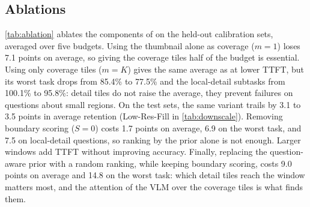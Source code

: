 \subsection{Ablations}
\label{sec:ablation}



\cref{tab:ablation} ablates the components of \method on the held-out calibration sets, averaged over
five budgets. Using the thumbnail alone as coverage ($m=1$) loses 7.1 points on average, so giving
the coverage tiles half of the budget is essential. Using only coverage tiles ($m=K$) gives the same average
as \method at lower TTFT, but its worst task drops from 85.4\% to 77.5\% and the local-detail subtasks
from 100.1\% to 95.8\%: detail tiles do not raise the average, they prevent failures on questions about
small regions. On the test sets, the same variant trails \method by 3.1 to 3.5 points in average retention
(Low-Res-Fill in \cref{tab:downscale}). Removing boundary scoring ($S=0$) costs 1.7 points on average, 6.9 on the worst task, and
7.5 on local-detail questions, so ranking by the prior alone is not enough. Larger windows add TTFT
without improving accuracy. Finally, replacing the question-aware prior with a random ranking, while
keeping boundary scoring, costs 9.0 points on average and 14.8 on the worst task: which detail tiles reach
the window matters most, and the attention of the VLM over the coverage tiles is what finds them.
